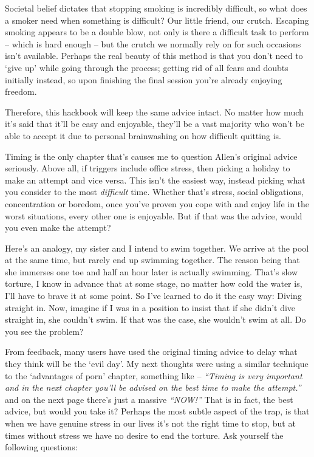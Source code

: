 \documentclass[
]{book}
\begin{document}
Societal belief dictates that stopping smoking is incredibly difficult, so what does a smoker need when something is difficult? Our little friend, our crutch. Escaping smoking appears to be a double blow, not only is there a difficult task to perform -- which is hard enough -- but the crutch we normally rely on for such occasions isn't available. Perhaps the real beauty of this method is that you don't need to `give up' while going through the process; getting rid of all fears and doubts initially instead, so upon finishing the final session you're already enjoying freedom.

Therefore, this hackbook will keep the same advice intact. No matter how much it's said that it'll be easy and enjoyable, they'll be a vast majority who won't be able to accept it due to personal brainwashing on how difficult quitting is.

Timing is the only chapter that's causes me to question Allen's original advice seriously. Above all, if triggers include office stress, then picking a holiday to make an attempt and vice versa. This isn't the easiest way, instead picking what you consider to the most \emph{difficult} time. Whether that's stress, social obligations, concentration or boredom, once you've proven you cope with and enjoy life in the worst situations, every other one is enjoyable. But if that was the advice, would you even make the attempt?

Here's an analogy, my sister and I intend to swim together. We arrive at the pool at the same time, but rarely end up swimming together. The reason being that she immerses one toe and half an hour later is actually swimming. That's slow torture, I know in advance that at some stage, no matter how cold the water is, I'll have to brave it at some point. So I've learned to do it the easy way: Diving straight in. Now, imagine if I was in a position to insist that if she didn't dive straight in, she couldn't swim. If that was the case, she wouldn't swim at all. Do you see the problem?

From feedback, many users have used the original timing advice to delay what they think will be the `evil day'. My next thoughts were using a similar technique to the `advantages of porn' chapter, something like -- \emph{``Timing is very important and in the next chapter you'll be advised on the best time to make the attempt.''} and on the next page there's just a massive \emph{``NOW!''} That is in fact, the best advice, but would you take it? Perhaps the most subtle aspect of the trap, is that when we have genuine stress in our lives it's not the right time to stop, but at times without stress we have no desire to end the torture. Ask yourself the following questions:
\end{document}
